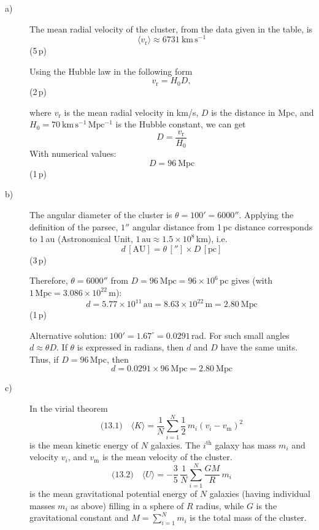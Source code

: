 \begin{description}
\item[a)] The mean radial velocity of the cluster, from the data given in
  the table, is
  \[ \langle v_{\mathrm{r}}\rangle \approx 6731\ \mathrm{km\,s^{-1}} \]
  \hfill(5\,p)

  Using the Hubble law in the following form
  \[ v_{\mathrm{r}} = H_0 D, \]
  \hfill(2\,p)

  where $v_{\mathrm{r}}$ is the mean radial velocity in km/s, $D$ is the
  distance in Mpc, and $H_0 = 70\ \mathrm{km\,s^{-1}\,Mpc^{-1}}$ is the
  Hubble constant, we can get
  \[ D = \frac{v_{\mathrm{r}}}{H_0} \]
  With numerical values:
  \[ D = 96\ \mathrm{Mpc} \]
  \hfill(1\,p)

\item[b)] The angular diameter of the cluster is
  $\theta = 100' = 6000''$. Applying the definition of the parsec, $1''$
  angular distance from 1\,pc distance corresponds to 1\,au (Astronomical
  Unit, $1\,\mathrm{au} \approx 1.5\times 10^{8}$\,km), i.e.
  \[ d\,[\mathrm{AU}] = \theta\,['']\times D\,[\mathrm{pc}] \]
  \hfill(3\,p)

  Therefore, $\theta = 6000''$ from
  $D = 96\ \mathrm{Mpc} = 96\times 10^{6}$\,pc gives (with
  $1\,\mathrm{Mpc} = 3.086\times 10^{22}$\,m):
  \[ d = 5.77\times 10^{11}\,\mathrm{au} = 8.63\times 10^{22}\,\mathrm{m}
     = 2.80\ \mathrm{Mpc} \]
  \hfill(1\,p)

  Alternative solution: $100' = 1.67^\circ = 0.0291$\,rad. For such small
  angles $d \approx \theta D$. If $\theta$ is expressed in radians, then
  $d$ and $D$ have the same units. Thus, if $D = 96$\,Mpc, then
  \[ d = 0.0291\times 96\ \mathrm{Mpc} = 2.80\ \mathrm{Mpc} \]

\item[c)] In the virial theorem
  \[ \text{(13.1)}\quad \langle K\rangle
     = \frac{1}{N}\sum_{i=1}^{N}\frac{1}{2}\,m_i(v_i - v_{\mathrm{m}})^2 \]
  is the mean kinetic energy of $N$ galaxies. The $i^{\mathrm{th}}$ galaxy
  has mass $m_i$ and velocity $v_i$, and $v_{\mathrm{m}}$ is the mean
  velocity of the cluster.
  \[ \text{(13.2)}\quad \langle U\rangle
     = -\frac{3}{5}\,\frac{1}{N}\sum_{i=1}^{N}\frac{GM}{R}\,m_i \]
  is the mean gravitational potential energy of $N$ galaxies (having
  individual masses $m_i$ as above) filling in a sphere of $R$ radius,
  while $G$ is the gravitational constant and
  $M = \sum_{i=1}^{N} m_i$ is the total mass of the cluster.


\end{description}
